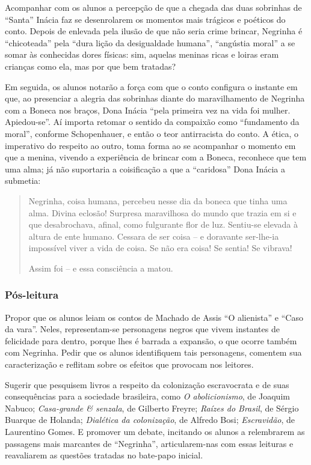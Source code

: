 \documentclass[12pt]{extarticle}
\begin{document}
Acompanhar com os alunos a percepção de que a chegada das duas sobrinhas
de ``Santa'' Inácia faz se desenrolarem os momentos mais trágicos e
poéticos do conto. Depois de enlevada pela ilusão de que não seria crime
brincar, Negrinha é ``chicoteada'' pela ``dura lição da desigualdade
humana'', ``angústia moral'' a se somar às conhecidas dores físicas:
sim, aquelas meninas ricas e loiras eram crianças como ela, mas por que
bem tratadas?

Em seguida, os alunos notarão a força com que o conto configura o
instante em que, ao presenciar a alegria das sobrinhas diante do
maravilhamento de Negrinha com a Boneca nos braços, Dona Inácia ``pela
primeira vez na vida foi mulher. Apiedou-se''. Aí importa retomar o
sentido da compaixão como ``fundamento da moral'', conforme
Schopenhauer, e então o teor antirracista do conto. A ética, o
imperativo do respeito ao outro, toma forma ao se acompanhar o momento
em que a menina, vivendo a experiência de brincar com a Boneca,
reconhece que tem uma alma; já não suportaria a coisificação a que a
``caridosa'' Dona Inácia a submetia:

\begin{quote}
Negrinha, coisa humana, percebeu nesse dia da boneca que tinha uma alma.
Divina eclosão! Surpresa maravilhosa do mundo que trazia em si e que
desabrochava, afinal, como fulgurante flor de luz. Sentiu-se elevada à
altura de ente humano. Cessara de ser coisa -- e doravante ser-lhe-ia
impossível viver a vida de coisa. Se não era coisa! Se sentia! Se
vibrava!

Assim foi -- e essa consciência a matou.
\end{quote}

\subsubsection{Pós-leitura}

Propor que os alunos leiam os contos de Machado de Assis ``O alienista''
e ``Caso da vara''. Neles, representam-se personagens negros que vivem
instantes de felicidade para dentro, porque lhes é barrada a expansão, o
que ocorre também com Negrinha. Pedir que os alunos identifiquem tais
personagens, comentem sua caracterização e reflitam sobre os efeitos que
provocam nos leitores.

Sugerir que pesquisem livros a respeito da colonização escravocrata e de
suas consequências para a sociedade brasileira, como \emph{O
abolicionismo}, de Joaquim Nabuco; \emph{Casa-grande \& senzala}, de
Gilberto Freyre; \emph{Raízes do Brasil}, de Sérgio Buarque de Holanda;
\emph{Dialética da colonização}, de Alfredo Bosi; \emph{Escravidão}, de
Laurentino Gomes. E promover um debate, incitando os alunos a
relembrarem as passagens mais marcantes de ``Negrinha'', articularem-nas
com essas leituras e reavaliarem as questões tratadas no bate-papo
inicial.
\end{document}
